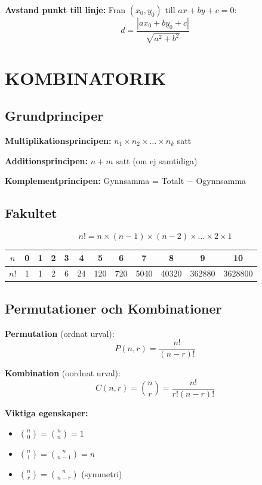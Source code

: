 \documentclass[11pt,a4paper]{article}
\newenvironment{formelbox}{\begin{framed}\color{mainblue}}{\end{framed}}
\begin{document}
\textbf{Avstand punkt till linje:} Fran $(x_0, y_0)$ till $ax + by + c = 0$:
\[ d = \frac{|ax_0 + by_0 + c|}{\sqrt{a^2 + b^2}} \]

\section{KOMBINATORIK}

\subsection{Grundprinciper}

\textbf{Multiplikationsprincipen:} $n_1 \times n_2 \times \ldots \times n_k$ satt

\textbf{Additionsprincipen:} $n + m$ satt (om ej samtidiga)

\textbf{Komplementprincipen:} Gynnsamma = Totalt $-$ Ogynnsamma

\subsection{Fakultet}

\[ n! = n \times (n-1) \times (n-2) \times \ldots \times 2 \times 1 \]

\begin{tabular}{|c|c|c|c|c|c|c|c|c|c|c|c|}
\hline
$n$ & 0 & 1 & 2 & 3 & 4 & 5 & 6 & 7 & 8 & 9 & 10 \\
\hline
$n!$ & 1 & 1 & 2 & 6 & 24 & 120 & 720 & 5040 & 40320 & 362880 & 3628800 \\
\hline
\end{tabular}

\subsection{Permutationer och Kombinationer}

\begin{formelbox}
\textbf{Permutation} (ordnat urval):
\[ P(n,r) = \frac{n!}{(n-r)!} \]

\textbf{Kombination} (oordnat urval):
\[ C(n,r) = \binom{n}{r} = \frac{n!}{r!(n-r)!} \]
\end{formelbox}

\textbf{Viktiga egenskaper:}
\begin{itemize}
\item $\binom{n}{0} = \binom{n}{n} = 1$
\item $\binom{n}{1} = \binom{n}{n-1} = n$
\item $\binom{n}{r} = \binom{n}{n-r}$ (symmetri)
\end{itemize}
\end{document}
